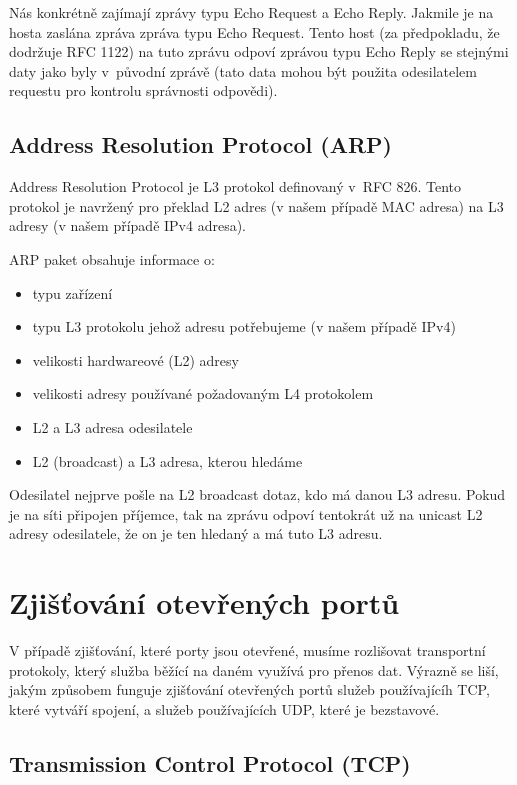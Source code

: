 \documentclass[../projekt.tex]{subfiles}
\begin{document}
Nás konkrétně zajímají zprávy typu Echo Request a Echo Reply. Jakmile je na hosta zaslána zpráva zpráva typu Echo Request. Tento host (za předpokladu, že dodržuje RFC 1122\cite{RFC1122}) na tuto zprávu odpoví zprávou typu Echo Reply se stejnými daty jako byly v~původní zprávě (tato data mohou být použita odesilatelem requestu pro kontrolu správnosti odpovědi).

\subsection{Address Resolution Protocol (ARP)} \label{arp}
Address Resolution Protocol je L3 protokol definovaný v~RFC 826\cite{RFC0826}. Tento protokol je navržený pro překlad L2 adres (v našem případě MAC adresa) na L3 adresy (v našem případě IPv4 adresa).

ARP paket obsahuje informace o:
\begin{itemize}
    \item typu zařízení
    \item typu L3 protokolu jehož adresu potřebujeme (v našem případě IPv4)
    \item velikosti hardwareové (L2) adresy
    \item velikosti adresy používané požadovaným L4 protokolem
    \item L2 a L3 adresa odesilatele
    \item L2 (broadcast) a L3 adresa, kterou hledáme
\end{itemize}

Odesilatel nejprve pošle na L2 broadcast dotaz, kdo má danou L3 adresu. Pokud je na síti připojen příjemce, tak na zprávu odpoví tentokrát už na unicast L2 adresy odesilatele, že on je ten hledaný a má tuto L3 adresu.

\section{Zjišťování otevřených portů}

V případě zjišťování, které porty jsou otevřené, musíme rozlišovat transportní protokoly, který služba běžící na daném využívá pro přenos dat. Výrazně se liší, jakým způsobem funguje zjišťování otevřených portů služeb používajícíh TCP, které vytváří spojení, a služeb používajících UDP, které je bezstavové.

\subsection{Transmission Control Protocol (TCP)} \label{tcp}
\end{document}
